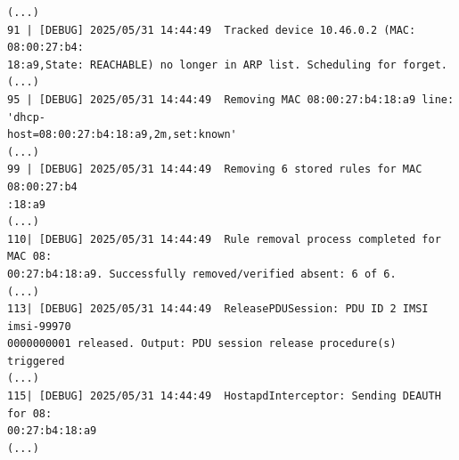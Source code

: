 \begin{lstlisting}[caption=\texttt{naun301} disconnected and \acs{5G-RG}'s \texttt{interceptor} proceeds to deauthenticating it removing traffic mapping rules for it and releasing it's dedicated \acs{PDU} session,label={lst:naun301_removed}]
(...)
91 | [DEBUG] 2025/05/31 14:44:49  Tracked device 10.46.0.2 (MAC: 08:00:27:b4:
18:a9,State: REACHABLE) no longer in ARP list. Scheduling for forget.
(...)
95 | [DEBUG] 2025/05/31 14:44:49  Removing MAC 08:00:27:b4:18:a9 line: 'dhcp-
host=08:00:27:b4:18:a9,2m,set:known'
(...)
99 | [DEBUG] 2025/05/31 14:44:49  Removing 6 stored rules for MAC 08:00:27:b4
:18:a9
(...)
110| [DEBUG] 2025/05/31 14:44:49  Rule removal process completed for MAC 08:
00:27:b4:18:a9. Successfully removed/verified absent: 6 of 6.
(...)
113| [DEBUG] 2025/05/31 14:44:49  ReleasePDUSession: PDU ID 2 IMSI imsi-99970
0000000001 released. Output: PDU session release procedure(s) triggered
(...)
115| [DEBUG] 2025/05/31 14:44:49  HostapdInterceptor: Sending DEAUTH for 08:
00:27:b4:18:a9
(...)
\end{lstlisting}

